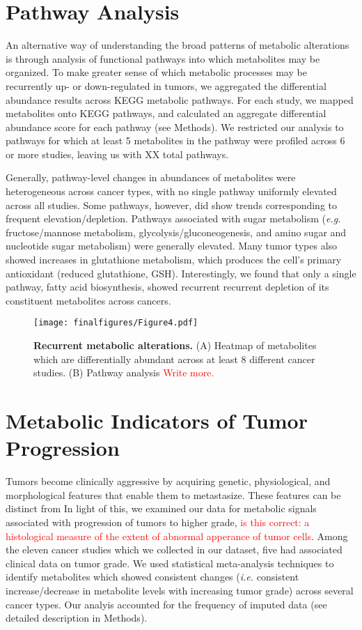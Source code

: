 \documentclass[10pt]{article}
\begin{document}
\section{Pathway Analysis}
An alternative way of understanding the broad patterns of metabolic alterations is through analysis of functional pathways into which metabolites may be organized. To make greater sense of which metabolic processes may be recurrently up- or down-regulated in tumors, we aggregated the differential abundance results across KEGG metabolic pathways. For each study, we mapped metabolites onto KEGG pathways, and calculated an aggregate differential abundance score for each pathway (see Methods). We restricted our analysis to pathways for which at least 5 metabolites in the pathway were profiled across 6 or more studies, leaving us with XX total pathways. 

Generally, pathway-level changes in abundances of metabolites were heterogeneous across cancer types, with no single pathway uniformly elevated across all studies. Some pathways, however, did show trends corresponding to frequent elevation/depletion. Pathways associated with sugar metabolism (\textit{e.g.} fructose/mannose metabolism, glycolysis/gluconeogenesis, and amino sugar and nucleotide sugar metabolism) were generally elevated. Many tumor types also showed increases in glutathione metabolism, which produces the cell's primary antioxidant (reduced glutathione, GSH). Interestingly, we found that only a single pathway, fatty acid biosynthesis, showed recurrent recurrent depletion of its constituent metabolites across cancers. 
\begin{figure}[ht!]
  \centering
     \texttt{[image: finalfigures/Figure4.pdf]}
  \caption{\textbf{Recurrent metabolic alterations.} (A) Heatmap of metabolites which are differentially abundant across at least 8 different cancer studies. (B) Pathway analysis \textcolor{red}{Write more.}}
     \label{fig:Fig4}
\end{figure}


\section{Metabolic Indicators of Tumor Progression}
Tumors become clinically aggressive by acquiring genetic, physiological, and morphological features that enable them to metastasize.  These features can be distinct from In light of this, we examined our data for metabolic signals associated with progression of tumors to higher grade, \textcolor{red}{is this correct: a histological measure of the extent of abnormal apperance of tumor cells}. Among the eleven cancer studies which we collected in our dataset, five had associated clinical data on tumor grade. We used statistical meta-analysis techniques to identify metabolites which showed consistent changes (\textit{i.e.} consistent increase/decrease in metabolite levels with increasing tumor grade) across several cancer types. Our analyis accounted for the frequency of imputed data (see detailed description in Methods).
\end{document}
